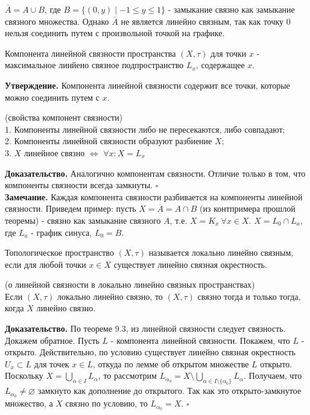 $\overline{A}=A\cup B$, где $B=\{(0,y)\mid -1\leqslant y\leqslant 1\}$ - 
замыкание связно как замыкание связного множества. Однако $\overline{A}$ 
не является линейно связным, так как точку 0 нельзя соединить 
путем с произвольной точкой на графике. 
\begin{defin}
Компонента линейной связности пространства $(X,\tau)$ для точки  $x$ - 
максимальное линйено связное подпространство  $L_x$, содержащее 
 $x$. 
\end{defin}
\textbf{Утверждение.} Компонента линейной связности содержит все точки, 
которые можно соединить путем с $x$. 
\begin{theor}
    (свойства компонент связности)\\
    1. Компоненты линейной связности либо не пересекаются, либо совпадают;\\
    2. Компоненты линейной связности образуют разбиение $X$;\\
    3. $X$ линейное связно  $\Leftrightarrow$ $\forall x:X=L_x$
\end{theor}
\textbf{Доказательство.}  Аналогично компонентам связности. Отличие только 
в том, что компоненты связности всегда замкнуты. $\square$ \\
\textbf{Замечание.} Каждая компонента связности разбивается на компоненты 
линейной связности. Приведем пример: пусть $X=\overline{A}=A\cap B$ (из
контпримера прошлой теоремы) - связно как замыкание связного $A$,
т.е.  $X=K_x~\forall x\in X$. $X=L_0\cap L_a$, где  $L_a$ - график синуса,
$L_0=B$.
\begin{defin}
Топологическое пространство $(X,\tau)$ называется локально линейно связным,
если для любой точки $x\in X$ существует линейно связная окрестность.
\end{defin}
 \begin{theor}
     (о линейной связности в локально линейно связных пространствах)\\
     Если $(X,\tau)$ локально линейно связно, то  $(X,\tau)$ связно тогда и 
     только тогда, когда $X$ линейно связно.
 \end{theor}
 \textbf{Доказательство.} По теореме 9.3, из линейной связности следует
 связность. Докажем обратное. Пусть $L$ - компонента линейной связности.
 Покажем, что $L$ - открыто. Действительно, по условию существует
 линейно связная окрестность $U_x\subset L$ для точек $x\in L$, откуда по 
 лемме об открытом множестве $L$ открыто. Поскольку  
 $X=\bigcup\limits_{\alpha\in I}L_\alpha$, то рассмотрим $L_{\alpha_0}=
 X\setminus \bigcup\limits_{\alpha\in I\setminus\{\alpha_0\} }L_\alpha$. 
 Получаем, что $L_{\alpha_0}\ne\varnothing$
 замкнуто как дополнение до открытого. Так как это открыто-замкнутое 
 множество, а $X$ связно по условию, то $L_{\alpha_0}=X$. $\square$ \\

















